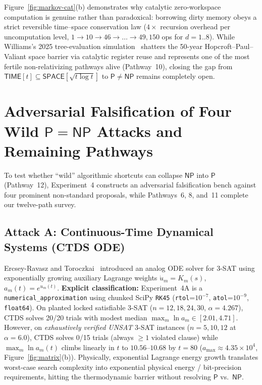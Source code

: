 \documentclass[11pt,reqno]{amsart}
\newcommand{\code}[1]{\texttt{\nolinkurl{#1}}}
\theoremstyle{definition}
\newcommand{\PP}{\mathsf{P}}
\newcommand{\NP}{\mathsf{NP}}
\newcommand{\TIME}{\mathsf{TIME}}
\newcommand{\SPACE}{\mathsf{SPACE}}
\begin{document}
Figure~\ref{fig:markov-cat}(b) demonstrates why catalytic zero-workspace computation is
genuine rather than paradoxical: borrowing dirty memory obeys a strict reversible
time--space conservation law ($4\times$ recursion overhead per uncomputation level,
$1 \to 10 \to 46 \to \dots \to 49{,}150$ ops for $d=1..8$). While Williams's 2025
tree-evaluation simulation~\cite{Williams2025} shatters the 50-year Hopcroft--Paul--Valiant
space barrier via catalytic register reuse and represents one of the most fertile
non-relativizing pathways alive (Pathway~10), closing the gap from
$\TIME[t] \subseteq \SPACE[\sqrt{t \log t}]$ to $\PP \neq \NP$ remains completely open.

\section{Adversarial Falsification of Four Wild \texorpdfstring{$\PP = \NP$}{P = NP} Attacks and Remaining Pathways}
\label{sec:falsifiers}

To test whether ``wild'' algorithmic shortcuts can collapse $\NP$ into $\PP$ (Pathway~12),
Experiment~4 constructs an adversarial falsification bench against four prominent
non-standard proposals, while Pathways~6, 8, and~11 complete our twelve-path survey.

\subsection{Attack A: Continuous-Time Dynamical Systems (CTDS ODE)}
Ercsey-Ravasz and Toroczkai~\cite{ErcseyRavaszToroczkai2011} introduced an analog ODE
solver for 3-SAT using exponentially growing auxiliary Lagrange weights
$\dot{u}_m = K_m(s)$, $a_m(t) = e^{u_m(t)}$. \textbf{Explicit classification:}
Experiment~4A is a \code{numerical_approximation} using chunked SciPy \texttt{RK45}
(\texttt{rtol}=$10^{-7}$, \texttt{atol}=$10^{-9}$, \texttt{float64}). On planted locked
satisfiable 3-SAT ($n=12,18,24,30$, $\alpha=4.267$), CTDS solves 20/20 trials with modest
median $\max_m \ln a_m \in [2.01, 4.71]$. However, on \emph{exhaustively verified UNSAT}
3-SAT instances ($n=5,10,12$ at $\alpha=6.0$), CTDS solves 0/15 trials (always $\ge 1$
violated clause) while $\max_m \ln a_m(t)$ climbs linearly in $t$ to $10.56$--$10.68$ by
$t=80$ ($a_{\max} \approx 4.35 \times 10^4$, Figure~\ref{fig:matrix}(b)). Physically,
exponential Lagrange energy growth translates worst-case search complexity into
exponential physical energy / bit-precision requirements, hitting the thermodynamic
barrier without resolving $\PP$ vs.\ $\NP$.
\end{document}
